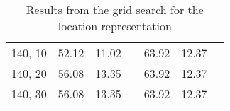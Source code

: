 \begin{table}[H]
\begin{tabular}{ccccccc}
140, 10                                           & 52.12                                                    & 11.02    &                                                             & 63.92                                                   & 12.37    &                                                             \\
140, 20                                           & 56.08                                                    & 13.35    &                                                             & 63.92                                                   & 12.37    &                                                             \\
140, 30                                           & 56.08                                                    & 13.35    &                                                             & 63.92                                                   & 12.37    &                                                             \\ \hline
\end{tabular}
\caption{Results from the grid search for the location-representation}
\label{tab:GridLoc}
\end{table}

